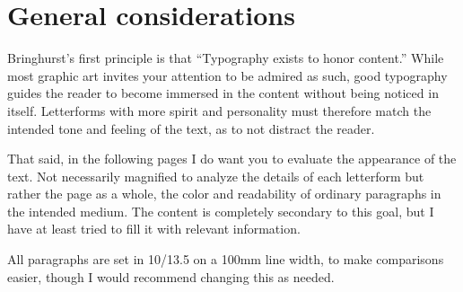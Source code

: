 \chapter{General considerations}

Bringhurst’s first principle is that “Typography exists to honor content.” While most graphic art invites your attention to be admired as such, good typography guides the reader to become immersed in the content without being noticed in itself. Letterforms with more spirit and personality must therefore match the intended tone and feeling of the text, as to not distract the reader. 

That said, in the following pages I do want you to evaluate the appearance of the text. Not necessarily magnified to analyze the details of each letterform but rather the page as a whole, the color and readability of ordinary paragraphs in the intended medium. The content is completely secondary to this goal, but I have at least tried to fill it with relevant information.

All paragraphs are set in 10/13.5 on a 100mm line width, to make comparisons easier, though
I would recommend changing this as needed.

